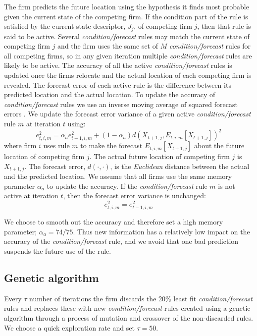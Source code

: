 \documentclass[preprint, 12pt]{elsarticle}
\begin{document}
The firm predicts the future location using the hypothesis it finds most probable given the current state of the competing firm. If the condition part of the rule is satisfied by the current state descriptor, $J_j$, of competing firm $j$, then that rule is said to be active. Several \emph{condition/forecast} rules may match the current state of competing firm $j$ and the firm uses the same set of $M$ \emph{condition/forecast} rules for all competing firms, so in any given iteration multiple \emph{condition/forecast} rules are likely to be active. The accuracy of all the active \emph{condition/forecast} rules is updated once the firms relocate and the actual location of each competing firm is revealed. The forecast error of each active rule is the difference between its predicted location and the actual location. To update the accuracy of \emph{condition/forecast} rules we use an inverse moving average of squared forecast errors \citep{Arthur_2014}. We update the forecast error variance of a given active \emph{condition/forecast} rule $m$ at iteration $t$ using:
\begin{equation}
e^2_{t,i,m} = \alpha_a e^2_{t-1,i,m} + (1-\alpha_a) d\left( X_{t+1,j}, E_{t,i,m} [X_{t+1,j}] \right)^2
\end{equation}
where firm $i$ uses rule $m$ to make the forecast $E_{t,i,m} [X_{t+1,j}]$ about the future location of competing firm $j$. The actual future location of competing firm $j$ is $X_{t+1,j}$. The forecast error, $d(\cdot,\cdot)$, is the \emph{Euclidean} distance between the actual and the predicted location. We assume that all firms use the same memory parameter $\alpha_a$ to update the accuracy. If the \emph{condition/forecast} rule $m$ is not active at iteration $t$, then the forecast error variance is unchanged: 
$$e^2_{t,i,m} = e^2_{t-1,i,m}$$

We choose to smooth out the accuracy and therefore set a high memory parameter; $\alpha_a = 74/75$. Thus new information has a relatively low impact on the accuracy of the \emph{condition/forecast} rule, and we avoid that one bad prediction suspends the future use of the rule.

\subsection{Genetic algorithm}
\label{app:gadetails}

Every $\tau$ number of iterations the firm discards the 20\% least fit \emph{condition/forecast} rules and replaces these with new \emph{condition/forecast} rules created using a genetic algorithm through a process of mutation and crossover of the non-discarded rules. We choose a quick exploration rate and set $\tau = 50$.
\end{document}
